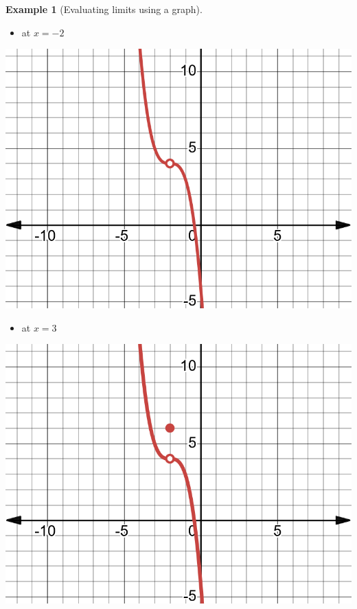 \documentclass[
]{book}
\providecommand{\tightlist}{%
  \setlength{\itemsep}{0pt}\setlength{\parskip}{0pt}}
\theoremstyle{definition}
\theoremstyle{definition}
\newtheorem{example}{Example}[chapter]
\theoremstyle{definition}
\theoremstyle{definition}
\theoremstyle{remark}
\begin{document}
\begin{example}[Evaluating limits using a graph]
\begin{itemize}
\tightlist
\item
  at \(x = -2\)
\end{itemize}

\includegraphics{fig/fig9.png}

\begin{itemize}
\tightlist
\item
  at \(x = 3\)
\end{itemize}

\includegraphics{fig/fig10.png}
\end{example}
\end{document}
